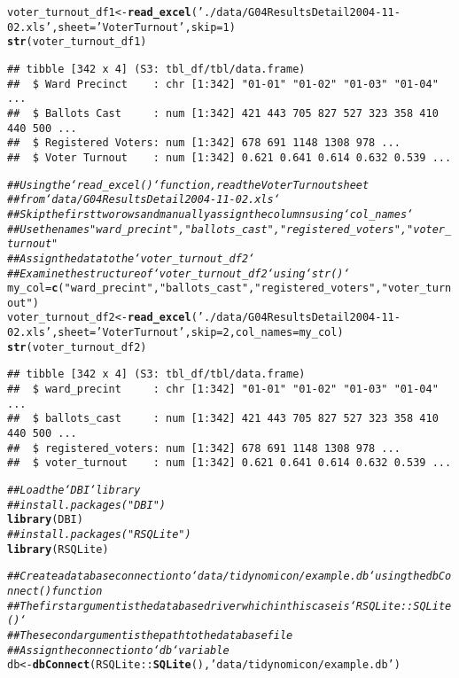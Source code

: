 \documentclass{article}\usepackage[]{graphicx}\usepackage[]{xcolor}
\makeatletter
\newcommand{\hlnum}[1]{\textcolor[rgb]{0.686,0.059,0.569}{#1}}%
\newcommand{\hlstr}[1]{\textcolor[rgb]{0.192,0.494,0.8}{#1}}%
\newcommand{\hlcom}[1]{\textcolor[rgb]{0.678,0.584,0.686}{\textit{#1}}}%
\newcommand{\hlopt}[1]{\textcolor[rgb]{0,0,0}{#1}}%
\newcommand{\hlstd}[1]{\textcolor[rgb]{0.345,0.345,0.345}{#1}}%
\newcommand{\hlkwb}[1]{\textcolor[rgb]{0.69,0.353,0.396}{#1}}%
\newcommand{\hlkwc}[1]{\textcolor[rgb]{0.333,0.667,0.333}{#1}}%
\newcommand{\hlkwd}[1]{\textcolor[rgb]{0.737,0.353,0.396}{\textbf{#1}}}%
\newenvironment{kframe}{%
 \def\at@end@of@kframe{}%
 \ifinner\ifhmode%
  \def\at@end@of@kframe{\end{minipage}}%
  \begin{minipage}{\columnwidth}%
 \fi\fi%
 \def\FrameCommand##1{\hskip\@totalleftmargin \hskip-\fboxsep
 \colorbox{shadecolor}{##1}\hskip-\fboxsep
     \hskip-\linewidth \hskip-\@totalleftmargin \hskip\columnwidth}%
 \MakeFramed {\advance\hsize-\width
   \@totalleftmargin\z@ \linewidth\hsize
   \@setminipage}}%
 {\par\unskip\endMakeFramed%
 \at@end@of@kframe}
\newenvironment{knitrout}{}{} %
\makeatother
\begin{document}
\begin{knitrout}
\begin{kframe}
\begin{alltt}
\hlstd{voter_turnout_df1} \hlkwb{<-} \hlkwd{read_excel}\hlstd{(}\hlstr{'./data/G04ResultsDetail2004-11-02.xls'}\hlstd{,} \hlkwc{sheet} \hlstd{=} \hlstr{'Voter Turnout'}\hlstd{,} \hlkwc{skip} \hlstd{=} \hlnum{1}\hlstd{)}
\hlkwd{str}\hlstd{(voter_turnout_df1)}
\end{alltt}
\begin{verbatim}
## tibble [342 x 4] (S3: tbl_df/tbl/data.frame)
##  $ Ward Precinct    : chr [1:342] "01-01" "01-02" "01-03" "01-04" ...
##  $ Ballots Cast     : num [1:342] 421 443 705 827 527 323 358 410 440 500 ...
##  $ Registered Voters: num [1:342] 678 691 1148 1308 978 ...
##  $ Voter Turnout    : num [1:342] 0.621 0.641 0.614 0.632 0.539 ...
\end{verbatim}
\begin{alltt}
\hlcom{## Using the `read_excel()` function, read the Voter Turnout sheet}
\hlcom{## from `data/G04ResultsDetail2004-11-02.xls`}
\hlcom{## Skip the first two rows and manually assign the columns using `col_names`}
\hlcom{## Use the names "ward_precint", "ballots_cast", "registered_voters", "voter_turnout"}
\hlcom{## Assign the data to the `voter_turnout_df2`}
\hlcom{## Examine the structure of `voter_turnout_df2` using `str()`}
\hlstd{my_col} \hlkwb{=}\hlkwd{c}\hlstd{(}\hlstr{"ward_precint"}\hlstd{,} \hlstr{"ballots_cast"}\hlstd{,} \hlstr{"registered_voters"}\hlstd{,} \hlstr{"voter_turnout"}\hlstd{)}
\hlstd{voter_turnout_df2} \hlkwb{<-} \hlkwd{read_excel}\hlstd{(}\hlstr{'./data/G04ResultsDetail2004-11-02.xls'}\hlstd{,} \hlkwc{sheet} \hlstd{=} \hlstr{'Voter Turnout'}\hlstd{,} \hlkwc{skip} \hlstd{=} \hlnum{2}\hlstd{,} \hlkwc{col_names} \hlstd{= my_col)}
\hlkwd{str}\hlstd{(voter_turnout_df2)}
\end{alltt}
\begin{verbatim}
## tibble [342 x 4] (S3: tbl_df/tbl/data.frame)
##  $ ward_precint     : chr [1:342] "01-01" "01-02" "01-03" "01-04" ...
##  $ ballots_cast     : num [1:342] 421 443 705 827 527 323 358 410 440 500 ...
##  $ registered_voters: num [1:342] 678 691 1148 1308 978 ...
##  $ voter_turnout    : num [1:342] 0.621 0.641 0.614 0.632 0.539 ...
\end{verbatim}
\begin{alltt}
\hlcom{## Load the `DBI` library}
\hlcom{##install.packages("DBI")}
\hlkwd{library}\hlstd{(DBI)}
\hlcom{##install.packages("RSQLite")}
\hlkwd{library}\hlstd{(RSQLite)}


\hlcom{## Create a database connection to `data/tidynomicon/example.db` using the dbConnect() function}
\hlcom{## The first argument is the database driver which in this case is `RSQLite::SQLite()`}
\hlcom{## The second argument is the path to the database file}
\hlcom{## Assign the connection to `db` variable}
\hlstd{db} \hlkwb{<-} \hlkwd{dbConnect}\hlstd{(RSQLite}\hlopt{::}\hlkwd{SQLite}\hlstd{(),} \hlstr{'data/tidynomicon/example.db'}\hlstd{)}


\end{alltt}
\end{kframe}
\end{knitrout}
\end{document}
